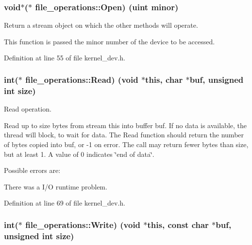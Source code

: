 \subsubsection[{\texorpdfstring{Open}{Open}}]{\setlength{\rightskip}{0pt plus 5cm}void$\ast$($\ast$ file\+\_\+operations\+::\+Open) ({\bf uint} minor)}\hypertarget{structfile__operations_a2732da2af03e1fc7ba0b63a529ab1411}{}\label{structfile__operations_a2732da2af03e1fc7ba0b63a529ab1411}


Return a stream object on which the other methods will operate. 

This function is passed the minor number of the device to be accessed. 

Definition at line 55 of file kernel\+\_\+dev.\+h.

\subsubsection[{\texorpdfstring{Read}{Read}}]{\setlength{\rightskip}{0pt plus 5cm}int($\ast$ file\+\_\+operations\+::\+Read) (void $\ast$this, char $\ast$buf, unsigned int size)}\hypertarget{structfile__operations_a59d973a490a6861c498ac9cc9c32dbf5}{}\label{structfile__operations_a59d973a490a6861c498ac9cc9c32dbf5}


Read operation. 

Read up to \textquotesingle{}size\textquotesingle{} bytes from stream \textquotesingle{}this\textquotesingle{} into buffer \textquotesingle{}buf\textquotesingle{}. If no data is available, the thread will block, to wait for data. The Read function should return the number of bytes copied into buf, or -\/1 on error. The call may return fewer bytes than \textquotesingle{}size\textquotesingle{}, but at least 1. A value of 0 indicates \char`\"{}end of data\char`\"{}.

Possible errors are\+:
\begin{DoxyItemize}
\item There was a I/O runtime problem. 
\end{DoxyItemize}

Definition at line 69 of file kernel\+\_\+dev.\+h.

\subsubsection[{\texorpdfstring{Write}{Write}}]{\setlength{\rightskip}{0pt plus 5cm}int($\ast$ file\+\_\+operations\+::\+Write) (void $\ast$this, const char $\ast$buf, unsigned int size)}\hypertarget{structfile__operations_a75d4020e8a146c1611dc40184d211ec6}{}\label{structfile__operations_a75d4020e8a146c1611dc40184d211ec6}


